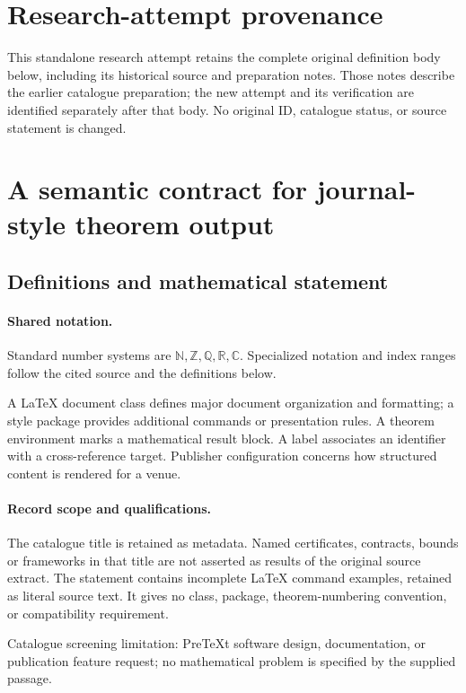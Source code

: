 \documentclass[11pt]{article}
\begin{document}
\section*{Research-attempt provenance}
This standalone research attempt retains the complete original definition body below,
including its historical source and preparation notes. Those notes describe the
earlier catalogue preparation; the new attempt and its verification are identified
separately after that body. No original ID, catalogue status, or source statement is changed.

\section{A semantic contract for journal-style theorem output}\label{statement}

\subsection{Definitions and mathematical statement}

\paragraph{Shared notation.}Standard number systems are $\mathbb N,\mathbb Z,\mathbb Q,\mathbb R,\mathbb C$. Specialized notation and index ranges follow the cited source and the definitions below.


A LaTeX document class defines major document organization and formatting; a style package provides additional commands or presentation rules. A theorem environment marks a mathematical result block. A label associates an identifier with a cross-reference target. Publisher configuration concerns how structured content is rendered for a venue.
\paragraph{Record scope and qualifications.}
The catalogue title is retained as metadata. Named certificates, contracts, bounds or frameworks in that title are not asserted as results of the original source extract.
The statement contains incomplete LaTeX command examples, retained as literal source text. It gives no class, package, theorem-numbering convention, or compatibility requirement.

Catalogue screening limitation: PreTeXt software design, documentation, or publication feature request; no mathematical problem is specified by the supplied passage.
\end{document}
